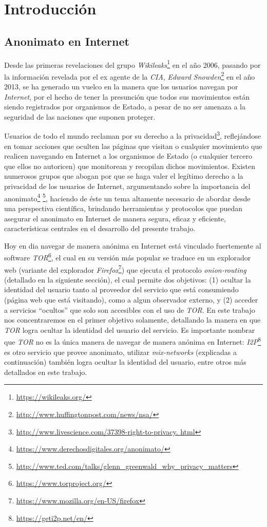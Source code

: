 \chapter{Introducción}\label{cap1}

\section{Anonimato en Internet}

Desde las primeras revelaciones del grupo \emph{Wikileaks}\footnote{\url{https://wikileaks.org/}} en el año 2006, 
pasando por la información revelada por el ex agente de la \emph{CIA}, \emph{Edward Snowden}\footnote{\url{http://www.huffingtonpost.com/news/nsa/}} 
en el año 2013, se ha generado un vuelco en la manera que 
los usuarios navegan por \emph{Internet}, por el hecho de tener la presunción que todos sus movimientos están siendo 
registrados por organismos de Estado, a pesar de no ser amenaza a la seguridad de las naciones que suponen proteger.

Usuarios de todo el mundo reclaman por su derecho a la privacidad\footnote{\url{http://www.livescience.com/37398-right-to-privacy.
html}}, reflejándose en tomar acciones que oculten las páginas que visitan o cualquier movimiento que realicen 
navegando en Internet a los organismos de Estado (o cualquier tercero que ellos no autoricen) que monitorean y 
recopilan dichos movimientos. Existen numerosos grupos que abogan por que se haga valer el legítimo derecho a la 
privacidad de los usuarios de Internet, argumentando sobre la importancia del anonimato\footnote{\url{https://www.derechosdigitales.org/anonimato/}} 
\footnote{\url{http://www.ted.com/talks/glenn_greenwald_why_privacy_matters}}, haciendo de éste un tema altamente 
necesario de abordar desde una perspectiva científica, brindando herramientas y protocolos que puedan asegurar el 
anonimato en Internet de manera segura, eficaz y eficiente, características centrales en el desarrollo del presente trabajo.

Hoy en dia navegar de manera anónima en Internet está vinculado fuertemente al software \emph{TOR}\footnote{\url{https://www.torproject.org/}}, 
el cual en su versión más popular se traduce en un explorador web (variante del explorador 
\emph{Firefox}\footnote{\url{https://www.mozilla.org/en-US/firefox}}) que ejecuta el protocolo \emph{onion-routing} 
(detallado en la siguiente sección), el cual permite dos objetivos: (1) ocultar la identidad del usuario tanto al proveedor 
del servicio que está consumiendo (página web que está visitando), como a algun observador externo, y (2) acceder a servicios ``ocultos'' que solo 
son accesibles con el uso de \emph{TOR}. En este trabajo nos concentraremos en el primer objetivo solamente, detallando la manera en que 
\emph{TOR} logra ocultar la identidad del usuario del servicio. Es importante nombrar que \emph{TOR} no es la única manera de 
navegar de manera anónima en Internet: \emph{I2P}\footnote{\url{https://geti2p.net/en/}} es otro servicio que provee anonimato, 
utilizar \emph{mix-networks} (explicadas a continuación) también logra ocultar la identidad del usuario, entre otros más 
detallados en este trabajo.

